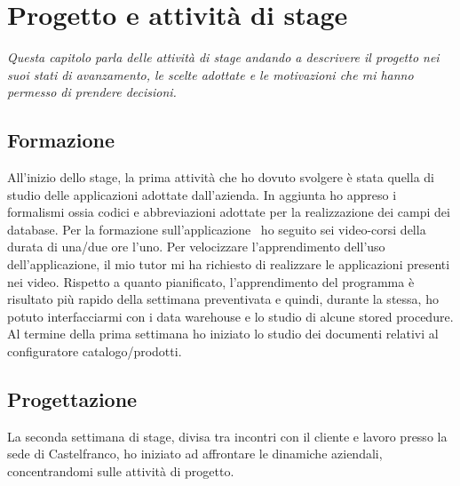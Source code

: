 \chapter{Progetto e attività di stage}
\textit{Questa capitolo parla delle attività di stage andando a descrivere il progetto nei suoi stati di avanzamento, le scelte adottate e le motivazioni che mi hanno permesso di prendere decisioni.}

\section{Formazione}
All'inizio dello stage, la prima attività che ho dovuto svolgere è stata quella di studio delle applicazioni adottate dall'azienda. In aggiunta ho appreso i formalismi ossia codici e abbreviazioni adottate per la realizzazione dei campi dei database. 
Per la formazione sull'applicazione \inde\, ho seguito sei video-corsi della durata di una/due ore l'uno. Per velocizzare l'apprendimento dell'uso dell'applicazione, il mio tutor mi ha richiesto di realizzare le applicazioni presenti nei video.
Rispetto a quanto pianificato, l'apprendimento del programma è risultato più rapido della settimana preventivata e quindi, durante la stessa, ho potuto interfacciarmi con i data warehouse e lo studio di alcune stored procedure. 
Al termine della prima settimana ho iniziato lo studio dei documenti relativi al configuratore catalogo/prodotti.


\section{Progettazione}
La seconda settimana di stage, divisa tra incontri con il cliente e lavoro presso la sede di Castelfranco, ho iniziato ad affrontare le dinamiche aziendali, concentrandomi sulle attività di progetto.

